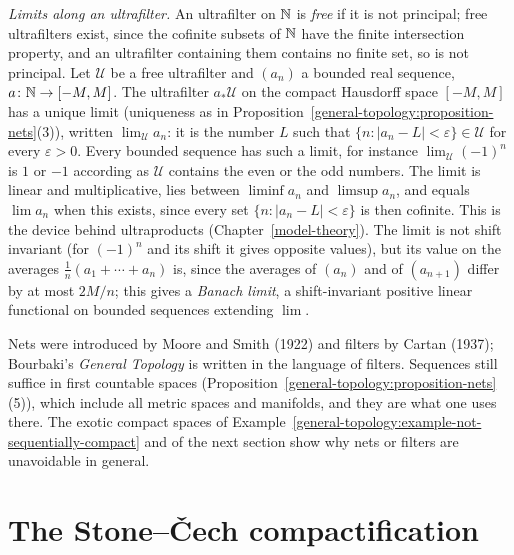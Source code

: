 \begin{example}\label{general-topology:example-ultrafilter-limits}
\emph{Limits along an ultrafilter.} An ultrafilter on $\mathbb{N}$ is \emph{free} if it is not principal; free ultrafilters exist, since the cofinite subsets of $\mathbb{N}$ have the finite intersection property, and an
ultrafilter containing them contains no finite set, so is not principal. Let $\mathcal{U}$ be a free ultrafilter and $(a_n)$ a bounded real sequence, $a \colon \mathbb{N} \to [-M, M]$. The ultrafilter
$a_*\mathcal{U}$ on the compact Hausdorff space $[-M, M]$ has a unique limit (uniqueness as in Proposition~\ref{general-topology:proposition-nets}(3)), written $\lim_{\mathcal{U}}a_n$: it is the number $L$ such that
$\{n : |a_n - L| < \varepsilon\} \in \mathcal{U}$ for every $\varepsilon > 0$. Every bounded sequence has such a limit, for instance $\lim_{\mathcal{U}}(-1)^n$ is $1$ or $-1$ according as $\mathcal{U}$ contains the
even or the odd numbers. The limit is linear and multiplicative, lies between $\liminf a_n$ and $\limsup a_n$, and equals $\lim a_n$ when this exists, since every set $\{n : |a_n - L| < \varepsilon\}$ is
then cofinite. This is the device behind ultraproducts (Chapter~\ref{model-theory}). The limit is not shift invariant (for $(-1)^n$ and its shift it gives opposite values), but its value on the
averages $\frac1n(a_1 + \cdots + a_n)$ is, since the averages of $(a_n)$ and of $(a_{n+1})$ differ by at most $2M/n$; this gives a \emph{Banach limit}, a shift-invariant positive linear functional on
bounded sequences extending $\lim$.
\end{example}

\begin{remark}\label{general-topology:remark-nets-filters}
Nets were introduced by Moore and Smith (1922) and filters by Cartan (1937); Bourbaki's \emph{General Topology} is written in the language of filters. Sequences still suffice in
first countable spaces (Proposition~\ref{general-topology:proposition-nets}(5)), which include all metric spaces and manifolds, and they are what one uses there. The exotic compact spaces of
Example~\ref{general-topology:example-not-sequentially-compact} and of the next section show why nets or filters are unavoidable in general.
\end{remark}

\section{The Stone--\v{C}ech compactification}\label{general-topology:section-stone-cech}

